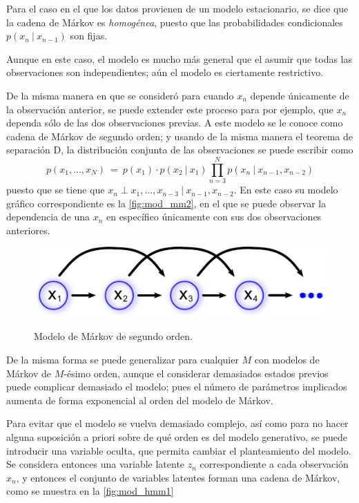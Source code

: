Para el caso en el que los datos provienen de un modelo estacionario, se dice que 
la cadena de Márkov es \textit{homogénea}, puesto que las probabilidades condicionales 
$p(x_n ~|~ x_{n-1})$ son fijas.

Aunque en este caso, el modelo es mucho más general que el asumir que todas las 
observaciones son independientes; aún el modelo es ciertamente restrictivo. 

De la misma manera en que se consideró para cuando $x_n$ depende únicamente de 
la observación anterior, se puede extender este proceso para por ejemplo, que 
$x_n$ dependa sólo de las dos observaciones previas. A este modelo  se le conoce 
como cadena de Márkov de segundo orden; y usando de la misma manera el teorema 
de separación D, la distribución conjunta de las observaciones se puede escribir como 
\begin{equation}
\label{eqn:3-5}
p(x_1, ..., x_N) ~=~ p(x_1) \cdot p(x_2 ~|~ x_1) \prod_{n=3}^N p(x_n ~|~ x_{n-1}, x_{n-2})
\end{equation}
puesto que se tiene que $x_n \perp x_1, ..., x_{n-3} ~|~ x_{n-1}, x_{n-2}$.
En este caso su modelo gráfico correspondiente es la \autoref{fig:mod_mm2}, en el que 
se puede observar la dependencia de una $x_n$ en específico únicamente con sus 
dos observaciones anteriores.

\begin{figure}[bt]
        \myfloatalign
        {\includegraphics[width=0.6\linewidth]{gfx/3-mod-mm2}}
        \caption{Modelo de Márkov de segundo orden.}
        \label{fig:mod_mm2}
\end{figure}

De la misma forma se puede generalizar para cualquier $M$ con modelos de Márkov 
de $M$-ésimo orden, aunque el considerar demasiados estados previos puede complicar
demasiado el modelo; pues el número de parámetros implicados aumenta de forma 
exponencial al orden del modelo de Márkov.

Para evitar que el modelo se vuelva demasiado complejo, así como para no hacer 
alguna suposición a priori sobre de qué orden es del modelo generativo, se puede 
introducir una variable oculta, que permita cambiar el planteamiento del modelo. 
Se considera entonces una variable latente $z_n$ correspondiente a cada observación 
$x_n$, y entonces el conjunto de variables latentes forman una cadena de Márkov, 
como se muestra en la \autoref{fig:mod_hmm1}

